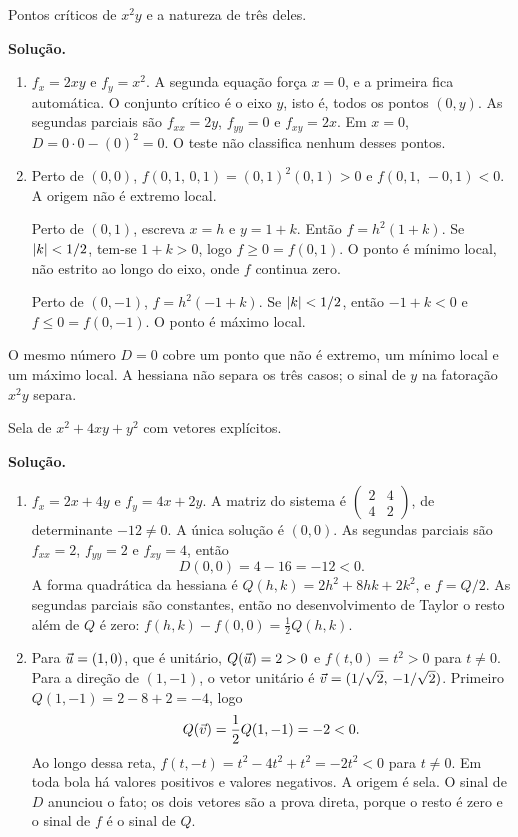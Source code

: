 \documentclass[11pt,a4paper]{article}
\begin{document}
\begin{exercicio}
Pontos críticos de $x^2 y$ e a natureza de três deles.

\textbf{Solução.}
\begin{enumerate}[label=\alph*)]
\item $f_x=2xy$ e $f_y=x^2$. A segunda equação força $x=0$, e a primeira fica automática. O conjunto crítico é o eixo $y$, isto é, todos os pontos $(0,y)$. As segundas parciais são $f_{xx}=2y$, $f_{yy}=0$ e $f_{xy}=2x$. Em $x=0$, $D=0\cdot 0-(0)^2=0$. O teste não classifica nenhum desses pontos.

\item Perto de $(0,0)$, $f(0{,}1,\,0{,}1)=(0{,}1)^2(0{,}1)>0$ e $f(0{,}1,\,-0{,}1)<0$. A origem não é extremo local.

Perto de $(0,1)$, escreva $x=h$ e $y=1+k$. Então $f=h^2(1+k)$. Se $\left\lvert k \right\rvert<1/2$, tem-se $1+k>0$, logo $f\ge 0=f(0,1)$. O ponto é mínimo local, não estrito ao longo do eixo, onde $f$ continua zero.

Perto de $(0,-1)$, $f=h^2(-1+k)$. Se $\left\lvert k \right\rvert<1/2$, então $-1+k<0$ e $f\le 0=f(0,-1)$. O ponto é máximo local.
\end{enumerate}
O mesmo número $D=0$ cobre um ponto que não é extremo, um mínimo local e um máximo local. A hessiana não separa os três casos; o sinal de $y$ na fatoração $x^2 y$ separa.
\end{exercicio}

\begin{exercicio}
Sela de $x^2+4xy+y^2$ com vetores explícitos.

\textbf{Solução.}
\begin{enumerate}[label=\alph*)]
\item $f_x=2x+4y$ e $f_y=4x+2y$. A matriz do sistema é $\begin{pmatrix}2&4\\4&2\end{pmatrix}$, de determinante $-12\neq 0$. A única solução é $(0,0)$. As segundas parciais são $f_{xx}=2$, $f_{yy}=2$ e $f_{xy}=4$, então
\[
D(0,0)=4-16=-12<0.
\]
A forma quadrática da hessiana é $Q(h,k)=2h^2+8hk+2k^2$, e $f=Q/2$. As segundas parciais são constantes, então no desenvolvimento de Taylor o resto além de $Q$ é zero: $f(h,k)-f(0,0)=\frac12 Q(h,k)$.

\item Para $\vec{u}=(1,0)$, que é unitário, $Q(\vec{u})=2>0$ e $f(t,0)=t^2>0$ para $t\neq 0$.
Para a direção de $(1,-1)$, o vetor unitário é $\vec{v}=(1/\sqrt{2},\,-1/\sqrt{2})$. Primeiro $Q(1,-1)=2-8+2=-4$, logo
\[
Q(\vec{v})=\frac{1}{2}Q(1,-1)=-2<0.
\]
Ao longo dessa reta, $f(t,-t)=t^2-4t^2+t^2=-2t^2<0$ para $t\neq 0$. Em toda bola há valores positivos e valores negativos. A origem é sela. O sinal de $D$ anunciou o fato; os dois vetores são a prova direta, porque o resto é zero e o sinal de $f$ é o sinal de $Q$.
\end{enumerate}
\end{exercicio}
\end{document}
